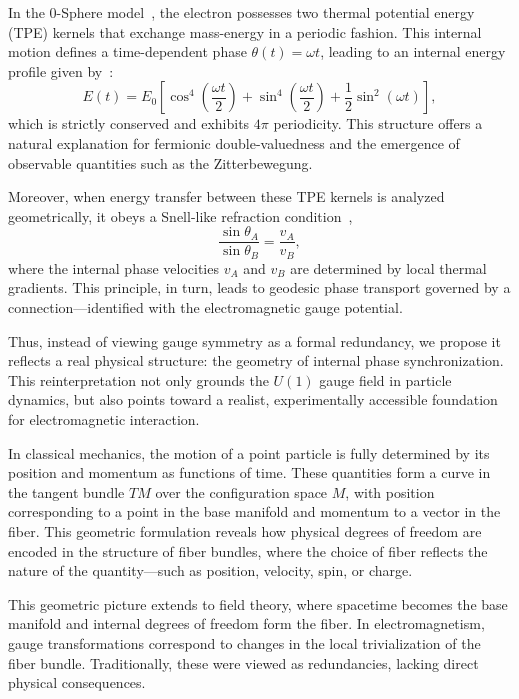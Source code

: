 \documentclass[%
 reprint,
 amsmath,amssymb,
 aps,
]{revtex4-1}
\numberwithin{equation}{section}%
\begin{document}
In the 0-Sphere model~\cite{hanamura2018}, the electron possesses two thermal potential energy (TPE) kernels that exchange mass-energy in a periodic fashion. This internal motion defines a time-dependent phase $\theta(t) = \omega t$, leading to an internal energy profile given by~\cite{hanamura2024quantum}:
\begin{equation}
E(t) = E_0 \left[ \cos^4\left( \frac{\omega t}{2} \right) + \sin^4\left( \frac{\omega t}{2} \right) + \frac{1}{2} \sin^2(\omega t) \right],
\label{eq:internal_energy}
\end{equation}
which is strictly conserved and exhibits $4\pi$ periodicity. This structure offers a natural explanation for fermionic double-valuedness and the emergence of observable quantities such as the Zitterbewegung.

Moreover, when energy transfer between these TPE kernels is analyzed geometrically, it obeys a Snell-like refraction condition~\cite{hanamura2024quantum},
\begin{equation}
\frac{\sin \theta_A}{\sin \theta_B} = \frac{v_A}{v_B},
\label{eq:snell}
\end{equation}
where the internal phase velocities $v_A$ and $v_B$ are determined by local thermal gradients. This principle, in turn, leads to geodesic phase transport governed by a connection—identified with the electromagnetic gauge potential.

Thus, instead of viewing gauge symmetry as a formal redundancy, we propose it reflects a real physical structure: the geometry of internal phase synchronization. This reinterpretation not only grounds the $U(1)$ gauge field in particle dynamics, but also points toward a realist, experimentally accessible foundation for electromagnetic interaction.

In classical mechanics, the motion of a point particle is fully determined by its position and momentum as functions of time. These quantities form a curve in the tangent bundle $TM$ over the configuration space  $M$, with position corresponding to a point in the base manifold and momentum to a vector in the fiber. This geometric formulation reveals how physical degrees of freedom are encoded in the structure of fiber bundles, where the choice of fiber reflects the nature of the quantity—such as position, velocity, spin, or charge.

This geometric picture extends to field theory, where spacetime becomes the base manifold and internal degrees of freedom form the fiber. In electromagnetism, gauge transformations correspond to changes in the local trivialization of the fiber bundle. Traditionally, these were viewed as redundancies, lacking direct physical consequences.
\end{document}
